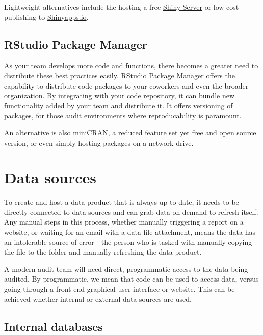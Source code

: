 \documentclass[
]{book}
\begin{document}
Lightweight alternatives include the hosting a free \href{https://rstudio.com/products/shiny/shiny-server/}{Shiny Server} or low-cost publishing to \href{https://www.shinyapps.io}{Shinyapps.io}.

\hypertarget{rstudio-package-manager}{%
\subsection{RStudio Package Manager}\label{rstudio-package-manager}}

As your team develops more code and functions, there becomes a greater need to distribute these best practices easily. \href{https://rstudio.com/products/package-manager/}{RStudio Package Manager} offers the capability to distribute code packages to your coworkers and even the broader organization. By integrating with your code repository, it can bundle new functionality added by your team and distribute it. It offers versioning of packages, for those audit environments where reproducability is paramount.

An alternative is also \href{https://cran.r-project.org/web/packages/miniCRAN/index.html}{miniCRAN}, a reduced feature set yet free and open source version, or even simply hosting packages on a network drive.

\hypertarget{data-sources}{%
\section{Data sources}\label{data-sources}}

To create and host a data product that is always up-to-date, it needs to be directly connected to data sources and can grab data on-demand to refresh itself. Any manual steps in this process, whether manually triggering a report on a website, or waiting for an email with a data file attachment, means the data has an intolerable source of error - the person who is tasked with manually copying the file to the folder and manually refreshing the data product.

A modern audit team will need direct, programmatic access to the data being audited. By programmatic, we mean that code can be used to access data, versus going through a front-end graphical user interface or website. This can be achieved whether internal or external data sources are used.

\hypertarget{internal-databases}{%
\subsection{Internal databases}\label{internal-databases}}
\end{document}
